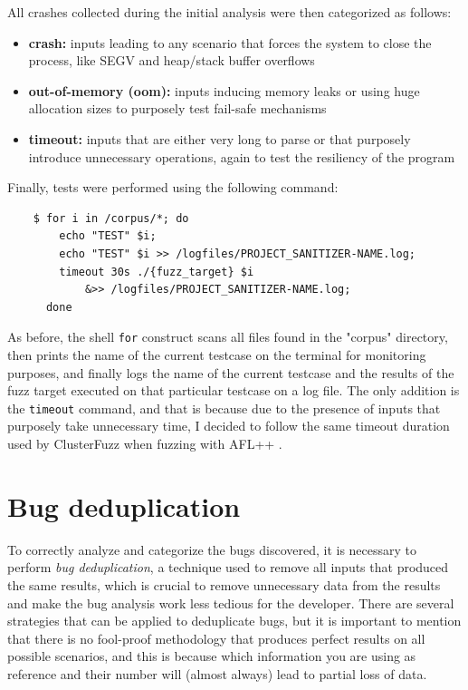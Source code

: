 \newpage
All crashes collected during the initial analysis were then categorized as follows:
\begin{itemize}
    \item \textbf{crash:} inputs leading to any scenario that forces the system to close the process, like SEGV and heap/stack buffer overflows
    \item \textbf{out-of-memory (oom):} inputs inducing memory leaks or using huge allocation sizes to purposely test fail-safe mechanisms
    \item \textbf{timeout:} inputs that are either very long to parse or that purposely introduce unnecessary operations, again to test the resiliency of the program 
\end{itemize}

Finally, tests were performed using the following command:
\begin{verbatim}
    $ for i in /corpus/*; do 
        echo "TEST" $i; 
        echo "TEST" $i >> /logfiles/PROJECT_SANITIZER-NAME.log; 
        timeout 30s ./{fuzz_target} $i 
            &>> /logfiles/PROJECT_SANITIZER-NAME.log; 
      done
\end{verbatim}
As before, the shell \verb|for| construct scans all files found in the "corpus" directory, then prints the name of the current testcase on the terminal for monitoring purposes, and finally logs the name of the current testcase and the results of the fuzz target executed on that particular testcase on a log file. The only addition is the \verb|timeout| command, and that is because due to the presence of inputs that purposely take unnecessary time, I decided to follow the same timeout duration used by ClusterFuzz when fuzzing with AFL++ \cite{timeout}.





\newpage
\section{Bug deduplication} \label{bug_dedup}
To correctly analyze and categorize the bugs discovered, it is necessary to perform \textit{bug deduplication}, a technique used to remove all inputs that produced the same results, which is crucial to remove unnecessary data from the results and make the bug analysis work less tedious for the developer. There are several strategies that can be applied to deduplicate bugs, but it is important to mention that there is no fool-proof methodology that produces perfect results on all possible scenarios, and this is because which information you are using as reference and their number will (almost always) lead to partial loss of data.

